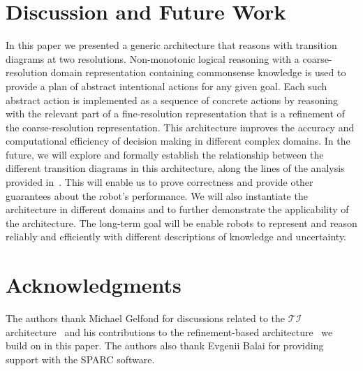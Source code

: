 \documentclass[letterpaper, 10 pt, conference]{article}  %
\begin{document}
\section{Discussion and Future Work}
In this paper we presented a generic architecture that reasons with
transition diagrams at two resolutions. Non-monotonic logical
reasoning with a coarse-resolution domain representation containing
commonsense knowledge is used to provide a plan of abstract
intentional actions for any given goal.  Each such abstract action is
implemented as a sequence of concrete actions by reasoning with the
relevant part of a fine-resolution representation that is a refinement
of the coarse-resolution representation. This architecture improves
the accuracy and computational efficiency of decision making in
different complex domains. In the future, we will explore and formally
establish the relationship between the different transition diagrams
in this architecture, along the lines of the analysis provided
in~\cite{sridharan2017refinement}. This will enable us to prove
correctness and provide other guarantees about the robot's
performance. We will also instantiate the architecture in different
domains and to further demonstrate the applicability of the
architecture. The long-term goal will be enable robots to represent
and reason reliably and efficiently with different descriptions of
knowledge and uncertainty.

\section*{Acknowledgments}
The authors thank Michael Gelfond for discussions related to the
$\mathcal{TI}$ architecture~\cite{blount2015theory} and his
contributions to the refinement-based
architecture~\cite{sridharan2017refinement} we build on in this paper.
The authors also thank Evgenii Balai for providing support with the
SPARC software.



 


\end{document}
